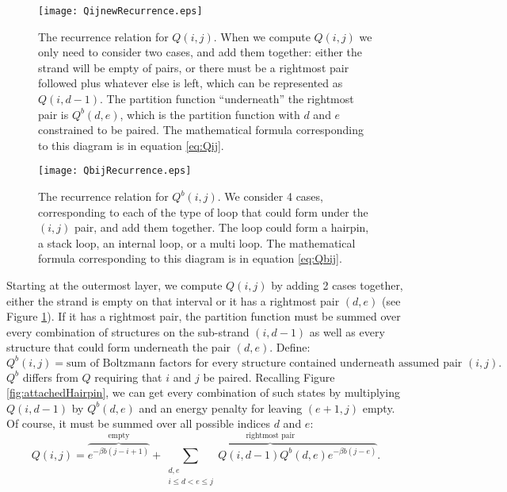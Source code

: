 \begin{figure}[t]
\centering
\texttt{[image: QijnewRecurrence.eps]}
\caption[$Q(i,j)$ Recurrence]{The recurrence relation for $Q(i,j)$. When we compute
  $Q(i,j)$ we only need to consider two cases, and add them together:
  either the strand will be empty of pairs, or there must be a
  rightmost pair followed plus whatever else is left, which can be
  represented as $Q(i, d-1)$. The partition function ``underneath''
  the rightmost pair is $Q^b(d, e)$, which is the partition function
  with $d$ and $e$ constrained to be paired. The mathematical formula
  corresponding to this diagram is in equation \ref{eq:Qij}.}
\label{fig:recurrenceRelationsQij}
\end{figure}
\begin{figure}[t]
\centering
\texttt{[image: QbijRecurrence.eps]}
\caption[$Q^b(i,j)$ Recurrence]{The recurrence relation for $Q^b(i,j)$. We consider 4 cases,
  corresponding to each of the type of loop that could form under the
  $(i,j)$ pair, and add them together. The loop could form a hairpin,
  a stack loop, an internal loop, or a multi loop. The mathematical
  formula corresponding to this diagram is in equation \ref{eq:Qbij}.}
\label{fig:recurrenceRelationsQbij}
\end{figure}

Starting at the outermost layer, we compute $Q(i,j)$ by adding 2 cases
together, either the strand is empty on that interval or it has a
rightmost pair $(d,e)$ (see Figure
\ref{fig:recurrenceRelationsQij}). If it has a rightmost pair, the
partition function must be summed over every combination of structures
on the sub-strand $(i, d-1)$ as well as every structure that could form
underneath the pair $(d,e)$. Define:
\begin{equation}
Q^b(i, j) = \text{sum of Boltzmann factors for every structure
  contained underneath assumed pair } (i,j).
\end{equation}
$Q^b$ differs from $Q$ requiring that $i$ and $j$ be paired.
Recalling Figure \ref{fig:attachedHairpin}, we can get every
combination of such states by multiplying $Q(i, d-1)$ by $Q^b(d,e)$
and an energy penalty for leaving $(e+1, j)$ empty. Of course, it must
be summed over all possible indices $d$ and $e$:
\begin{equation} 
Q(i,j) = \overbrace{e^{-\beta b(j-i+1)}}^{\text{empty}} + \overbrace{\sum_{\substack{ d,e \\ i \leq d < e \leq j}}Q(i, d - 1) Q^b(d, e) e^{-\beta b(j-e)}}^{\text{rightmost pair}}. 
\label{eq:Qij}
\end{equation}

